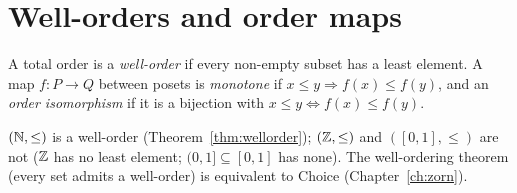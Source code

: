 \section{Well-orders and order maps}

\begin{definition}
	A total order is a \emph{well-order} if every non-empty subset has a least element. A map $f:P\to Q$ between posets is \emph{monotone} if $x\le y\Rightarrow f(x)\le f(y)$, and an \emph{order isomorphism} if it is a bijection with $x\le y\iff f(x)\le f(y)$.
\end{definition}
$(\mathbb{N},\le)$ is a well-order (Theorem~\ref{thm:wellorder}); $(\mathbb{Z},\le)$ and $([0,1],\le)$ are not ($\mathbb{Z}$ has no least element; $(0,1]\subseteq[0,1]$ has none). The well-ordering theorem (every set admits a well-order) is equivalent to Choice (Chapter~\ref{ch:zorn}).